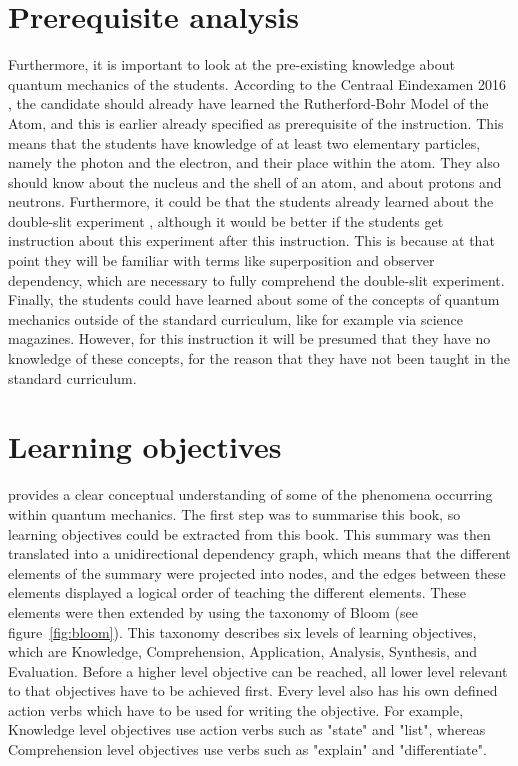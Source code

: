 \documentclass[11pt,twoside]{report} %
\begin{document}
\section{Prerequisite analysis}

Furthermore, it is important to look at the pre-existing knowledge about quantum mechanics of the students. According to the Centraal Eindexamen 2016 \cite{eindexamen2016}, the candidate should already have learned the Rutherford-Bohr Model of the Atom, and this is earlier already specified as prerequisite of the instruction. This means that the students have knowledge of at least two elementary particles, namely the photon and the electron, and their place within the atom. They also should know about the nucleus and the shell of an atom, and about protons and neutrons. Furthermore, it could be that the students already learned about the double-slit experiment \cite{eindexamen2015}, although it would be better if the students get instruction about this experiment after this instruction. This is because at that point they will be familiar with terms like superposition and observer dependency, which are necessary to fully comprehend the double-slit experiment. Finally, the students could have learned about some of the concepts of quantum mechanics outside of the standard curriculum, like for example via science magazines. However, for this instruction it will be presumed that they have no knowledge of these concepts, for the reason that they have not been taught in the standard curriculum.

\section{Learning objectives}

 provides a clear conceptual understanding of some of the phenomena occurring within quantum mechanics. The first step was to summarise this book, so learning objectives could be extracted from this book. This summary was then translated into a unidirectional dependency graph, which means that the different elements of the summary were projected into nodes, and the edges between these elements displayed a logical order of teaching the different elements. These elements were then extended by using the taxonomy of Bloom \cite{bloom} (see figure~\ref{fig:bloom}). This taxonomy describes six levels of learning objectives, which are Knowledge, Comprehension, Application, Analysis, Synthesis, and Evaluation. Before a higher level objective can be reached, all lower level relevant to that objectives have to be achieved first. Every level also has his own defined action verbs which have to be used for writing the objective. For example, Knowledge level objectives use action verbs such as "state" and "list", whereas Comprehension level objectives use verbs such as "explain" and "differentiate".
\end{document}
